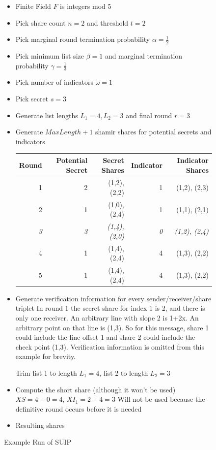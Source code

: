 \documentclass{dalcsthesis}
\begin{document}
\begin{figure}
  \caption{Example Run of SUIP}
  \label{Ex:SUI}
  \begin{itemize}
    \item Finite Field $F$ is integers mod 5
    \item Pick share count $n = 2$ and threshold $t = 2$
    \item Pick marginal round termination probability $\alpha = \frac{1}{2}$
    \item Pick minimum list size $\beta = 1$ and marginal termination probability $\gamma = \frac{1}{3}$
    \item Pick number of indicators $\omega = 1$
    \item Pick secret $s = 3$
    \item Generate list lengths $L_1 = 4, L_2 = 3$ and final round $r = 3$
    \item Generate $MaxLength+1$ shamir shares for potential secrets and indicators
  
      \begin{tabular}{|r|r|r|r|r|}
      \hline
        Round & Potential Secret & Secret Shares & Indicator & Indicator Shares \\
      \hline
        1 & 2  & (1,2), (2,2) & 1 & (1,2), (2,3) \\
      \hline
        2 & 1  & (1,0), (2,4) & 1 & (1,1), (2,1) \\
      \hline
        \emph{3} & \emph{3}  & \emph{(1,4), (2,0)} & \emph{0} & \emph{(1,2), (2,4)} \\
      \hline
        4 & 1  & (1,4), (2,4) & 4 & (1,3), (2,2) \\
      \hline
        5 & 1  & (1,4), (2,4) & 4 & (1,3), (2,2) \\
      \hline
      \end{tabular}
      
    \item Generate verification information for every sender/receiver/share triplet
    \subitem In round 1 the secret share for index 1 is 2, and there is only one receiver. An arbitrary line with slope 2 is 1+2x. An arbitrary point on that line is (1,3). So for this message, share 1 could include the line offset 1 and share 2 could include the check point (1,3).
    \subitem Verification information is omitted from this example for brevity.
    
    \subitem Trim list 1 to length $L_1 = 4$, list 2 to length $L_2 = 3$
    \item Compute the short share (although it won't be used)
    \subitem $XS = 4 - 0 = 4$, $XI_1 = 2 - 4 = 3$
    \subitem Will not be used because the definitive round occurs before it is needed
    \item Resulting shares
    

\end{itemize}
\end{figure}
\end{document}
